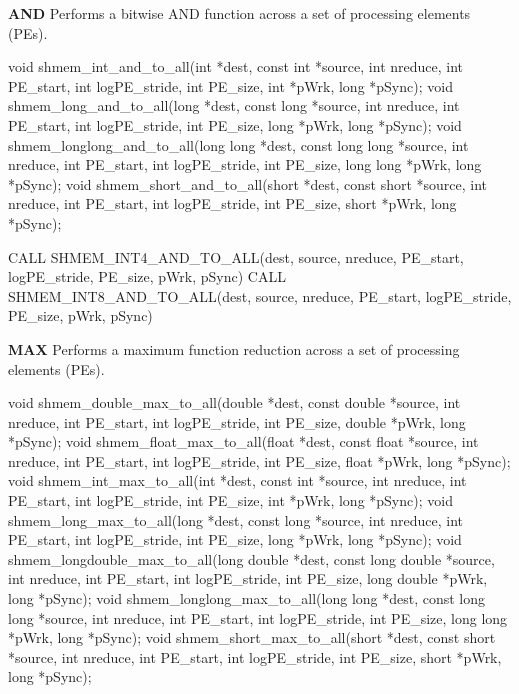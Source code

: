 
\begin{apidefinition}

\textbf{AND} \newline
Performs a bitwise AND function across a set of processing elements (\ac{PE}s).\newline
\begin{Csynopsis}
void shmem_int_and_to_all(int *dest, const int *source, int nreduce, int PE_start, int logPE_stride, int PE_size, int *pWrk, long *pSync);
void shmem_long_and_to_all(long *dest, const long *source, int nreduce, int PE_start, int logPE_stride, int PE_size, long *pWrk, long *pSync);
void shmem_longlong_and_to_all(long long *dest, const long long *source, int nreduce, int PE_start, int logPE_stride, int PE_size, long long *pWrk, long *pSync);
void shmem_short_and_to_all(short *dest, const short *source, int nreduce, int PE_start, int logPE_stride, int PE_size, short *pWrk, long *pSync);
\end{Csynopsis}

\begin{Fsynopsis}
CALL SHMEM_INT4_AND_TO_ALL(dest, source, nreduce, PE_start, logPE_stride, PE_size, pWrk, pSync)
CALL SHMEM_INT8_AND_TO_ALL(dest, source, nreduce, PE_start, logPE_stride, PE_size, pWrk, pSync)
\end{Fsynopsis}

\bigskip
\textbf{MAX} \newline
Performs a maximum function reduction across a set of processing elements (\ac{PE}s).\newline
\begin{Csynopsis}
void shmem_double_max_to_all(double *dest, const double *source, int nreduce, int PE_start, int logPE_stride, int PE_size, double *pWrk, long *pSync);
void shmem_float_max_to_all(float *dest, const float *source, int nreduce, int PE_start, int logPE_stride, int PE_size, float *pWrk, long *pSync);
void shmem_int_max_to_all(int *dest, const int *source, int nreduce, int PE_start, int logPE_stride, int PE_size, int *pWrk, long *pSync);
void shmem_long_max_to_all(long *dest, const long *source, int nreduce, int PE_start, int logPE_stride, int PE_size, long *pWrk, long *pSync);
void shmem_longdouble_max_to_all(long double *dest, const long double *source, int nreduce, int PE_start, int logPE_stride, int PE_size, long double *pWrk, long *pSync);
void shmem_longlong_max_to_all(long long *dest, const long long *source, int nreduce, int PE_start, int logPE_stride, int PE_size, long long *pWrk, long *pSync);
void shmem_short_max_to_all(short *dest, const short *source, int nreduce, int PE_start, int logPE_stride, int PE_size, short *pWrk, long *pSync);
\end{Csynopsis}


\end{apidefinition}

